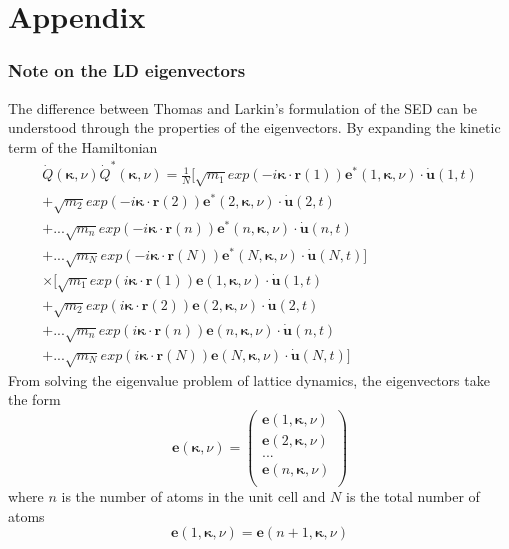 \chapter{Appendix}
\subsection*{Note on the LD eigenvectors}
The difference between Thomas and Larkin's formulation of the SED can be understood through the properties of the eigenvectors. By expanding the kinetic term of the Hamiltonian
\begin{equation}
\begin{split}
\dot{Q}(\bm{\kappa},\nu)\dot{Q}^*(\bm{\kappa},\nu)=\frac{1}{N}[\sqrt{m_1}exp(-i\bm{\kappa}\cdot\bm{r}(1))\bm{e}^*(1,\bm{\kappa},\nu)\cdot\dot{\bm{u}}(1,t)\\
+\sqrt{m_2}exp(-i\bm{\kappa}\cdot\bm{r}(2))\bm{e}^*(2,\bm{\kappa},\nu)\cdot\dot{\bm{u}}(2,t)\\
+...\sqrt{m_n}exp(-i\bm{\kappa}\cdot\bm{r}(n))\bm{e}^*(n,\bm{\kappa},\nu)\cdot\dot{\bm{u}}(n,t)\\
+...\sqrt{m_N}exp(-i\bm{\kappa}\cdot\bm{r}(N))\bm{e}^*(N,\bm{\kappa},\nu)\cdot\dot{\bm{u}}(N,t)]\\
\times[\sqrt{m_1}exp(i\bm{\kappa}\cdot\bm{r}(1))\bm{e}(1,\bm{\kappa},\nu)\cdot\dot{\bm{u}}(1,t)\\
+\sqrt{m_2}exp(i\bm{\kappa}\cdot\bm{r}(2))\bm{e}(2,\bm{\kappa},\nu)\cdot\dot{\bm{u}}(2,t)\\
+...\sqrt{m_n}exp(i\bm{\kappa}\cdot\bm{r}(n))\bm{e}(n,\bm{\kappa},\nu)\cdot\dot{\bm{u}}(n,t)\\
+...\sqrt{m_N}exp(i\bm{\kappa}\cdot\bm{r}(N))\bm{e}(N,\bm{\kappa},\nu)\cdot\dot{\bm{u}}(N,t)]
\end{split}
\end{equation}
From solving the eigenvalue problem of lattice dynamics, the eigenvectors take the form
\[
\bm{e}(\bm{\kappa},\nu)=
\begin{pmatrix}
\bm{e}(1,\bm{\kappa},\nu)\\
\bm{e}(2,\bm{\kappa},\nu)\\
...\\
\bm{e}(n,\bm{\kappa},\nu)\\
\end{pmatrix}
\]
where $n$ is the number of atoms in the unit cell and $N$ is the total number of atoms
\begin{equation}
\bm{e}(1,\bm{\kappa},\nu)=\bm{e}(n+1,\bm{\kappa},\nu)
\end{equation}
